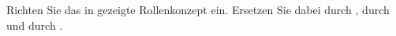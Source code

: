     \item Richten Sie das in  gezeigte Rollenkonzept ein. Ersetzen Sie dabei  durch ,  durch  und  durch .
